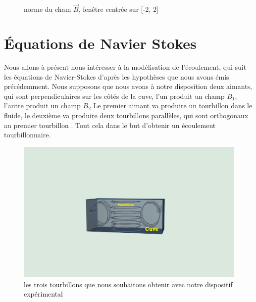\documentclass[a4paper,12pt,titlepage]{report}
\begin{document}
\begin{onehalfspace}
\begin{figure}[!h]
\begin{center}
\caption{norme du cham $\vec{B}$, fenêtre centrée sur [-2, 2]}
\label{figure 1}
\end{center}
\end{figure}
\newpage
\chapter{Équations de  Navier Stokes} 
Nous allons à présent nous intéresser à la modélisation de l'écoulement, qui suit les équations de Navier-Stokes d'après les hypothèses que nous avons émis précédemment. 
Nous supposons que nous avons à notre disposition deux aimants, qui sont perpendiculaires sur les côtés de la cuve, l'un produit un champ $B_1$, l'autre produit un champ $B_2$
Le premier aimant va produire un tourbillon dans le fluide, le deuxième va produire deux tourbillons parallèles, qui sont orthogonaux au premier tourbillon . Tout cela dans le but d'obtenir un écoulement tourbillonnaire. 
\begin{figure}[!h]
\begin{center}
\includegraphics[height = 8 cm, keepaspectratio]{graphes/3_tourbillons.png}
\caption{les trois tourbillons que nous souhaitons obtenir avec notre dispositif expérimental}
\label{figure 1}
\end{center}
\end{figure}
\newpage

\end{onehalfspace}
\end{document}
